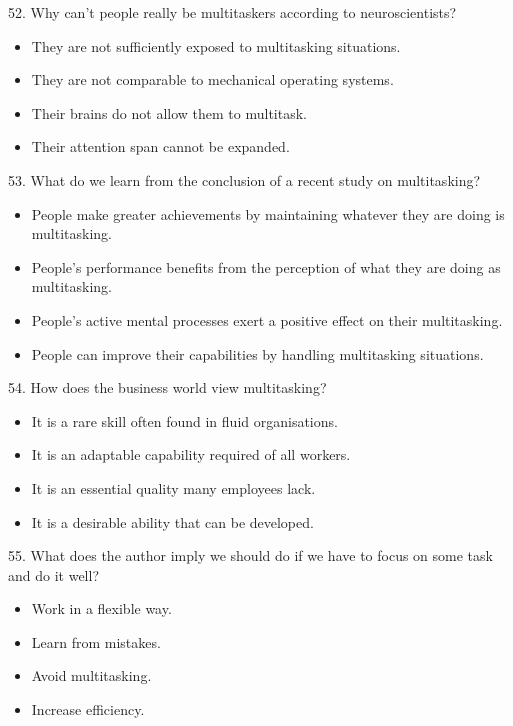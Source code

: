 \documentclass[UTF8,11pt]{ctexart}
\begin{document}
52. Why can’t people really be multitaskers according to neuroscientists?


\begin{itemize}[leftmargin=2em,itemsep=.2em,topsep=.4em]\item[A.] They are not sufficiently exposed to multitasking situations.
\item[B.] They are not comparable to mechanical operating systems.
\item[C.] Their brains do not allow them to multitask.
\item[D.] Their attention span cannot be expanded.
\end{itemize}

53. What do we learn from the conclusion of a recent study on multitasking?


\begin{itemize}[leftmargin=2em,itemsep=.2em,topsep=.4em]\item[A.] People make greater achievements by maintaining whatever they are doing is multitasking.
\item[B.] People’s performance benefits from the perception of what they are doing as multitasking.
\item[C.] People’s active mental processes exert a positive effect on their multitasking.
\item[D.] People can improve their capabilities by handling multitasking situations.
\end{itemize}

54. How does the business world view multitasking?


\begin{itemize}[leftmargin=2em,itemsep=.2em,topsep=.4em]\item[A.] It is a rare skill often found in fluid organisations.
\item[B.] It is an adaptable capability required of all workers.
\item[C.] It is an essential quality many employees lack.
\item[D.] It is a desirable ability that can be developed.
\end{itemize}

55. What does the author imply we should do if we have to focus on some task and do it well?


\begin{itemize}[leftmargin=2em,itemsep=.2em,topsep=.4em]\item[A.] Work in a flexible way.
\item[B.] Learn from mistakes.
\item[C.] Avoid multitasking.
\item[D.] Increase efficiency.
\end{itemize}
\end{document}
